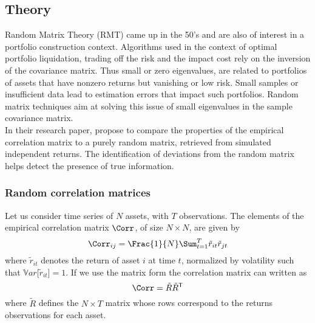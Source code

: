 \subsection{Theory}
Random Matrix Theory (RMT) came up in the 50's and are also of interest in a portfolio construction context.
Algorithms used in the context of optimal portfolio liquidation, trading off the risk and the impact cost rely on the inversion of the covariance matrix. Thus small or zero eigenvalues, are related to portfolios of assets that have nonzero returns but vanishing or low risk. Small samples or insufficient data lead to estimation errors that impact such portfolios. Random matrix techniques aim at solving this issue of small eigenvalues in the sample covariance matrix.  \\

In their research paper, \cite{Laloux1999} propose to compare the properties of the empirical correlation matrix to a purely random matrix, retrieved from simulated independent returns. The identification of deviations from the random matrix helps detect the presence of true information. 

\subsubsection{Random correlation matrices}

Let us consider time series of $N$ assets, with $T$ observations. The elements of the empirical correlation matrix $\Corr$, of size $N \times N$, are given by
\begin{equation*}
  \Corr_{ij} = \Frac{1}{N} \Sum_{t=1}^T \tilde{r}_{it} \tilde{r}_{jt}
\end{equation*}  
where $\tilde{r}_{it}$ denotes the return of asset $i$ at time $t$, normalized by volatility such that $\mathbb{V}ar\lbrack\tilde{r}_{it}\rbrack = 1$. If we use the matrix form the correlation matrix can written as
\begin{equation*}
  \Corr = \tilde{R} \tilde{R}^\mathsf{T}
\end{equation*}  
where $\tilde{R}$ defines the $N \times T$ matrix whose rows correspond to the returns observations for each asset. 


